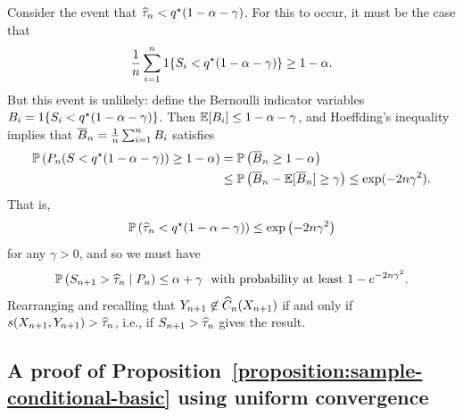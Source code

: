 \documentclass[11pt]{article}
\newcommand{\scorefunc}{s}
\newcommand{\scoreval}{\scorefunc}
\newcommand{\scorerv}{S}
\begin{document}
Consider the event that $\widehat{\tau}_n < q^\star(1 - \alpha - \gamma)$.
%
For this to occur, it must be the case that
\begin{equation}
  \label{eqn:quantile-too-small}
  \frac{1}{n} \sum_{i = 1}^n \indic{\scorerv_i < q\opt(1 - \alpha - \gamma)}
  \ge 1 - \alpha.
\end{equation}
But this event is unlikely: define the Bernoulli indicator variables $B_i =
\indic{\scorerv_i < q\opt(1 - \alpha - \gamma)}$.
%
Then $\mathbb{E}[B_i] \le 1 -
\alpha - \gamma$, and Hoeffding's inequality implies
that $\overline{B}_n = \frac{1}{n} \sum_{i = 1}^n B_i$ satisfies
\begin{align*}
  \P\left(P_n(\scorerv < q\opt(1 - \alpha - \gamma)) \ge 1 - \alpha
  \right)
  & = \P\left(\wb{B}_n \ge 1 - \alpha\right) \\
  & \le \P\left(\wb{B}_n - \E[\wb{B}_n] \ge \gamma\right)
  \le \exp(-2 n \gamma^2).
\end{align*}
That is,
\begin{align*}
  \mathbb{P}\left(\widehat{\tau}_n < q^\star(1 - \alpha - \gamma)\right)
  \le \exp\left(-2n\gamma^2 \right)
\end{align*}
for any $\gamma > 0$, and so we must have
\begin{equation*}
  \P\left(\scorerv_{n + 1} > \what{\tau}_n \mid P_n \right) \le \alpha + \gamma
  ~~ \mbox{with~probability~at~least}~
  1 - e^{-2n\gamma^2}.
\end{equation*}
Rearranging and recalling that $Y_{n + 1} \not \in \widehat{C}_n(X_{n + 1})$ if
and only if $\scoreval(X_{n+1}, Y_{n + 1}) > \what{\tau}_n$, i.e., if
$\scorerv_{n + 1} > \what{\tau}_n$ gives the result.

\subsection{A proof of Proposition~\ref{proposition:sample-conditional-basic}
  using uniform convergence}
\label{sec:baby-uniform-convergence}
\end{document}
